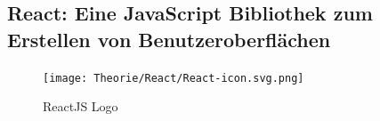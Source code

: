\subsection{React: Eine JavaScript Bibliothek zum Erstellen von Benutzeroberflächen}
\cite{reactjs}
\label{reactjs}


\begin{figure}[H]
\end{figure}

\begin{figure}[H]
  \begin{center}
    \texttt{[image: Theorie/React/React-icon.svg.png]}
    \caption{ReactJS Logo \cite{reactjs}}
  \end{center}
\end{figure}


